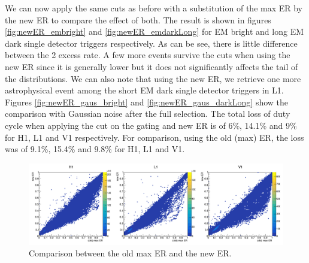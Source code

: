 We can now apply the same cuts as before with a substitution of the max ER by the new ER to compare the effect of both.
The result is shown in figures \ref{fig:newER_embright} and \ref{fig:newER_emdarkLong} for EM bright and long EM dark single detector triggers respectively.
As can be see, there is little difference between the 2 excess rate.
A few more events survive the cuts when using the new ER since it is generally lower but it does not significantly affects the tail of the distributions.
We can also note that using the new ER, we retrieve one more astrophysical event among the short EM dark single detector triggers in L1.
Figures \ref{fig:newER_gaus_bright} and \ref{fig:newER_gaus_darkLong} show the comparison with Gaussian noise after the full selection.
The total loss of duty cycle when applying the cut on the gating and new ER is of 6\%, 14.1\% and 9\% for H1, L1 and V1 respectively.
For comparison, using the old (max) ER, the loss was of 9.1\%, 15.4\% and 9.8\% for H1, L1 and V1.
% 
\begin{figure}
  \centering
  \includegraphics[width=\linewidth]{sectionSelection/plotsNewER/cOldNew.png}
  \caption{Comparison between the old max ER and the new ER.}
  \label{fig:compareOldNewER}
\end{figure}
% 
